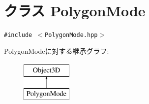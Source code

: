 \hypertarget{classm3g_1_1PolygonMode}{
\section{クラス PolygonMode}
\label{classm3g_1_1PolygonMode}
}
{\tt \#include $<$PolygonMode.hpp$>$}

PolygonModeに対する継承グラフ:\begin{figure}[H]
\begin{center}
\leavevmode
\includegraphics[height=2cm]{classm3g_1_1PolygonMode}
\end{center}
\end{figure}
